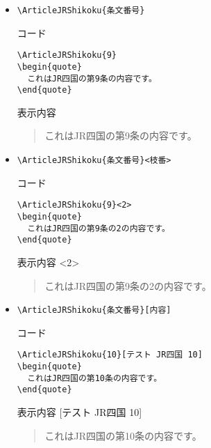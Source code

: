 \documentclass[oneside,10pt,a4paper]{jsarticle}
\begin{document}
  \begin{itemize}
    \item \verb|\ArticleJRShikoku{条文番号}|
      \begin{itembox}[l]{コード}
        {\footnotesize\begin{verbatim}
\ArticleJRShikoku{9}
\begin{quote}
  これはJR四国の第9条の内容です。
\end{quote}\end{verbatim}}
      \end{itembox}
      \begin{itembox}[l]{表示内容}
        \begin{quote}
          これはJR四国の第9条の内容です。
        \end{quote}
      \end{itembox}
    \item \verb|\ArticleJRShikoku{条文番号}<枝番>|
      \begin{itembox}[l]{コード}
        {\footnotesize\begin{verbatim}
\ArticleJRShikoku{9}<2>
\begin{quote}
  これはJR四国の第9条の2の内容です。
\end{quote}\end{verbatim}}
      \end{itembox}
      \begin{itembox}[l]{表示内容}
        <2>
        \begin{quote}
          これはJR四国の第9条の2の内容です。
        \end{quote}
      \end{itembox}
    \newpage
    \item \verb|\ArticleJRShikoku{条文番号}[内容]|
      \begin{itembox}[l]{コード}
        {\footnotesize\begin{verbatim}
\ArticleJRShikoku{10}[テスト JR四国 10]
\begin{quote}
  これはJR四国の第10条の内容です。
\end{quote}\end{verbatim}}
      \end{itembox}
      \begin{itembox}[l]{表示内容}
        [テスト JR四国 10]
        \begin{quote}
          これはJR四国の第10条の内容です。
        \end{quote}
      \end{itembox}

\end{itemize}
\end{document}
